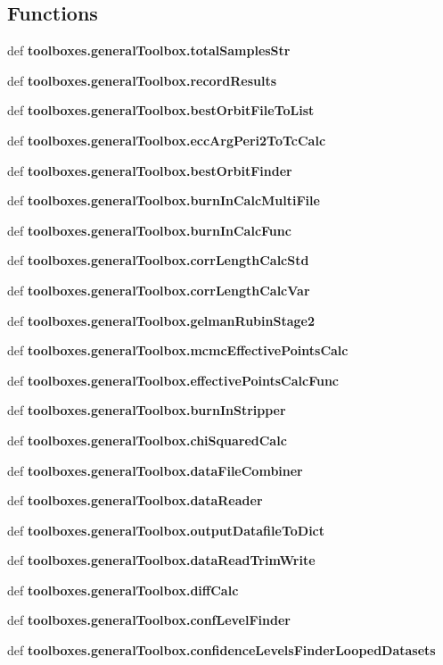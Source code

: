 \subsection*{Functions}
\begin{DoxyCompactItemize}
\item 
def {\bf toolboxes.\-general\-Toolbox.\-total\-Samples\-Str}
\item 
def {\bf toolboxes.\-general\-Toolbox.\-record\-Results}
\item 
def {\bf toolboxes.\-general\-Toolbox.\-best\-Orbit\-File\-To\-List}
\item 
def {\bf toolboxes.\-general\-Toolbox.\-ecc\-Arg\-Peri2\-To\-Tc\-Calc}
\item 
def {\bf toolboxes.\-general\-Toolbox.\-best\-Orbit\-Finder}
\item 
def {\bf toolboxes.\-general\-Toolbox.\-burn\-In\-Calc\-Multi\-File}
\item 
def {\bf toolboxes.\-general\-Toolbox.\-burn\-In\-Calc\-Func}
\item 
def {\bf toolboxes.\-general\-Toolbox.\-corr\-Length\-Calc\-Std}
\item 
def {\bf toolboxes.\-general\-Toolbox.\-corr\-Length\-Calc\-Var}
\item 
def {\bf toolboxes.\-general\-Toolbox.\-gelman\-Rubin\-Stage2}
\item 
def {\bf toolboxes.\-general\-Toolbox.\-mcmc\-Effective\-Points\-Calc}
\item 
def {\bf toolboxes.\-general\-Toolbox.\-effective\-Points\-Calc\-Func}
\item 
def {\bf toolboxes.\-general\-Toolbox.\-burn\-In\-Stripper}
\item 
def {\bf toolboxes.\-general\-Toolbox.\-chi\-Squared\-Calc}
\item 
def {\bf toolboxes.\-general\-Toolbox.\-data\-File\-Combiner}
\item 
def {\bf toolboxes.\-general\-Toolbox.\-data\-Reader}
\item 
def {\bf toolboxes.\-general\-Toolbox.\-output\-Datafile\-To\-Dict}
\item 
def {\bf toolboxes.\-general\-Toolbox.\-data\-Read\-Trim\-Write}
\item 
def {\bf toolboxes.\-general\-Toolbox.\-diff\-Calc}
\item 
def {\bf toolboxes.\-general\-Toolbox.\-conf\-Level\-Finder}
\item 
def {\bf toolboxes.\-general\-Toolbox.\-confidence\-Levels\-Finder\-Looped\-Datasets}
\item 

\end{DoxyCompactItemize}
